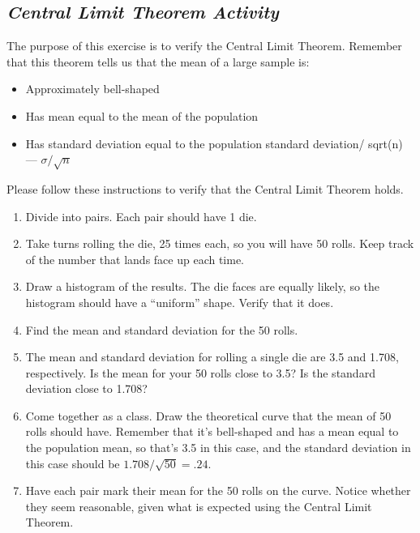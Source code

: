 \subsection{\textbf{\textit{Central Limit Theorem Activity}}}
The purpose of this exercise is to verify the Central
 Limit Theorem. Remember that this theorem tells us that the mean of a large sample is:
\begin{itemize}[leftmargin=1cm, itemsep=.2em]
\item Approximately bell-shaped
\item Has mean equal to the mean of the population
\item Has standard deviation equal to the population standard deviation/ sqrt(n) --- $\sigma/\sqrt{n}$
\end{itemize}

Please follow these instructions to verify that the Central Limit Theorem holds.
\begin{enumerate}[leftmargin=1cm, itemsep=.2em]
\item Divide into pairs. Each pair should have 1 die. 
\item Take turns rolling the die, 25 times each, so you will have 50 rolls. Keep track of the number that lands face up each time.
\item Draw a histogram of the results. The die faces are equally likely, so the histogram should have a ``uniform'' shape. Verify that it does.
\item Find the mean and standard deviation for the 50 rolls.
\item The mean and standard deviation for rolling a single die are 3.5 and 1.708, respectively. Is the mean for your 50 rolls close to 3.5? Is the standard deviation close to 1.708?
\item Come together as a class. Draw the theoretical curve that the mean of 50 rolls should have. Remember that it's bell-shaped and has a mean equal to the population mean, so that's 3.5 in this case, and the standard deviation in this case should be $1.708/\sqrt{50} = .24$.
\item Have each pair mark their mean for the 50 rolls on the curve. Notice whether they seem reasonable, given what is expected using the Central Limit Theorem.
\end{enumerate}

